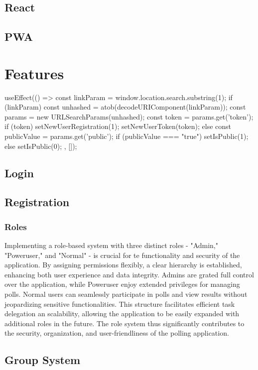 \documentclass[a4paper,12pt]{report}
\begin{document}
\section{React}
\section{PWA}
\chapter{Features}
\begin{jsminted}
useEffect(() => {
	const linkParam = window.location.search.substring(1);
	if (linkParam) {
		const unhashed = atob(decodeURIComponent(linkParam));
		const params = new URLSearchParams(unhashed);
		const token = params.get('token');
		if (token) {
			setNewUserRegistration(1);
			setNewUserToken(token);
		} else {
			const publicValue = params.get('public');
			if (publicValue === "true") {
				setIsPublic(1);
			} else {
				setIsPublic(0);
			}
		}
	}
}, []);
\end{jsminted}


\section{Login}
\section{Registration}
\subsection{Roles}
Implementing a role-based system with three distinct roles - "Admin," "Poweruser," and "Normal" - is crucial for te functionality and security of the application. By assigning permissions flexibly, a clear hierarchy is established, enhancing both user experience and data integrity. Admins are grated full control over the application, while Poweruser enjoy extended privileges for managing polls. Normal users can seamlessly participate in polls and view results without jeopardizing sensitive functionalities. This structure facilitates efficient task delegation an scalability, allowing the application to be easily expanded with additional roles  in the future. The role system thus significantly contributes to the security, organization, and user-friendliness of the polling application.
\section{Group System}
\end{document}
